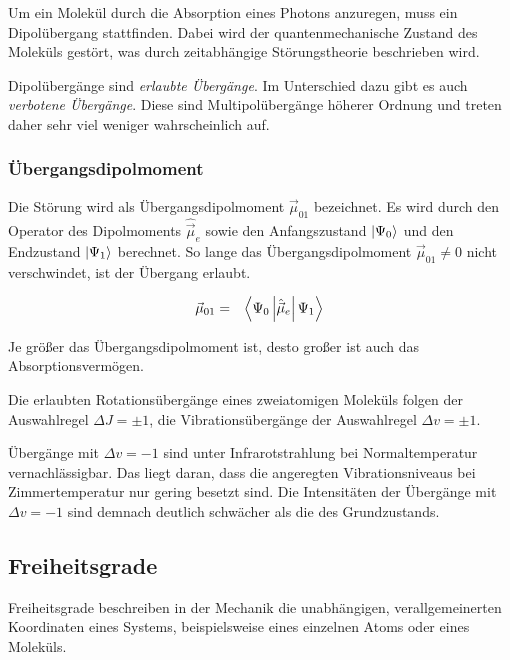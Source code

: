 \documentclass[12pt,a4paper]{scrartcl}
\numberwithin{equation}{section} %
\begin{document}
	Um ein Molekül durch die Absorption eines Photons anzuregen, muss ein Dipolübergang stattfinden. Dabei wird der quantenmechanische Zustand des Moleküls gestört, was durch zeitabhängige Störungstheorie beschrieben wird. \cite{Hinderer}
	
	Dipolübergänge sind \emph{erlaubte Übergänge}. Im Unterschied dazu gibt es auch \emph{verbotene Übergänge}. Diese sind Multipolübergänge höherer Ordnung und treten daher sehr viel weniger wahrscheinlich auf.
	
	\hypertarget{uxfcbergangsdipolmoment}{\subsubsection{Übergangsdipolmoment}\label{uxfcbergangsdipolmoment}}
	
	Die Störung wird als Übergangsdipolmoment $\vec\mu_{01}$ bezeichnet. Es wird durch den Operator des Dipolmoments $\hat {\vec \mu}_e$ sowie den Anfangszustand $\ket{\Psi_0}$ und den Endzustand $\ket{\Psi_1}$ berechnet. So lange das Übergangsdipolmoment $\vec\mu_{01}\neq0$ nicht verschwindet, ist der Übergang erlaubt.
	
	\begin{eqnarray}
		\vec \mu_{01} &=& \expval{\Psi_0\left|\hat {\vec \mu}_e\right|\Psi_1}
	\end{eqnarray}
	
	\noindent
	Je größer das Übergangsdipolmoment ist, desto großer ist auch das Absorptionsvermögen.
	
	Die erlaubten Rotationsübergänge eines zweiatomigen Moleküls folgen der Auswahlregel $\Delta J = \pm 1$, die Vibrationsübergänge der Auswahlregel $\Delta v = \pm 1$.
	
	Übergänge mit $\Delta v = -1$ sind unter Infrarotstrahlung bei Normaltemperatur vernachlässigbar. Das liegt daran, dass die angeregten Vibrationsniveaus bei Zimmertemperatur nur gering besetzt sind. Die Intensitäten der Übergänge mit $\Delta v = -1$ sind demnach deutlich schwächer als die des Grundzustands.
	
	\hypertarget{freiheitsgrade}{%
		\subsection{Freiheitsgrade}\label{freiheitsgrade}}
	
	Freiheitsgrade beschreiben in der Mechanik die unabhängigen, verallgemeinerten Koordinaten eines Systems, beispielsweise eines einzelnen Atoms oder eines Moleküls.
	
\end{document}
